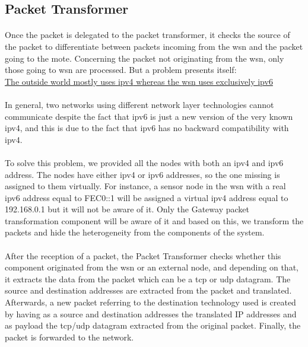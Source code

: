 \documentclass[12pt,a4paper,final]{report}
\begin{document}
\subsection{Packet Transformer}
\paragraph{}
Once the packet is delegated to the packet transformer, it checks the source of the packet to differentiate between packets incoming from the \gls{wsn} and the packet going to the mote. Concerning the packet not originating from the \gls{wsn}, only those going to \gls{wsn} are processed. But a problem presents itself: \\
\underline{The outside world mostly uses \gls{ipv4} whereas the \gls{wsn} uses exclusively \gls{ipv6}}
\paragraph{}

In general, two networks using different network layer technologies cannot communicate despite the fact that \gls{ipv6} is just a new version of the very known \gls{ipv4}, and this is due to the fact that \gls{ipv6} has no backward compatibility with \gls{ipv4}.
\paragraph{}
To solve this problem, we provided all the nodes with both an \gls{ipv4} and \gls{ipv6} address. The nodes have either \gls{ipv4} or \gls{ipv6} addresses, so the one missing is assigned to them virtually. For instance, a sensor node in the \gls{wsn} with a real \gls{ipv6} address equal to FEC0::1 will be assigned a virtual \gls{ipv4} address equal to 192.168.0.1 but it will not be aware of it. Only the Gateway packet transformation component will be aware of it and based on this, we transform the packets and hide the heterogeneity from the components of the system.
\paragraph{}
After the reception of a packet, the Packet Transformer checks whether this component originated from the \gls{wsn} or an external node, and depending on that, it extracts the data from the packet which can be a \gls{tcp} or \gls{udp} datagram. The source and destination addresses are extracted from the packet and translated. Afterwards, a new packet referring to the destination technology used is created by having as a source and destination addresses the translated IP addresses and as payload the \gls{tcp}/\gls{udp} datagram extracted from the original packet. Finally, the packet is forwarded to the network.
\end{document}
